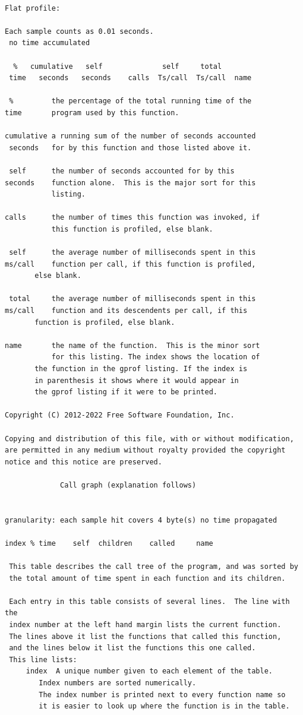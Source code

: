 \documentclass{report}
\begin{document}
\begin{verbatim}

Flat profile:

Each sample counts as 0.01 seconds.
 no time accumulated

  %   cumulative   self              self     total           
 time   seconds   seconds    calls  Ts/call  Ts/call  name    

 %         the percentage of the total running time of the
time       program used by this function.

cumulative a running sum of the number of seconds accounted
 seconds   for by this function and those listed above it.

 self      the number of seconds accounted for by this
seconds    function alone.  This is the major sort for this
           listing.

calls      the number of times this function was invoked, if
           this function is profiled, else blank.

 self      the average number of milliseconds spent in this
ms/call    function per call, if this function is profiled,
	   else blank.

 total     the average number of milliseconds spent in this
ms/call    function and its descendents per call, if this
	   function is profiled, else blank.

name       the name of the function.  This is the minor sort
           for this listing. The index shows the location of
	   the function in the gprof listing. If the index is
	   in parenthesis it shows where it would appear in
	   the gprof listing if it were to be printed.

Copyright (C) 2012-2022 Free Software Foundation, Inc.

Copying and distribution of this file, with or without modification,
are permitted in any medium without royalty provided the copyright
notice and this notice are preserved.

		     Call graph (explanation follows)


granularity: each sample hit covers 4 byte(s) no time propagated

index % time    self  children    called     name

 This table describes the call tree of the program, and was sorted by
 the total amount of time spent in each function and its children.

 Each entry in this table consists of several lines.  The line with the
 index number at the left hand margin lists the current function.
 The lines above it list the functions that called this function,
 and the lines below it list the functions this one called.
 This line lists:
     index	A unique number given to each element of the table.
		Index numbers are sorted numerically.
		The index number is printed next to every function name so
		it is easier to look up where the function is in the table.


\end{verbatim}
\end{document}
